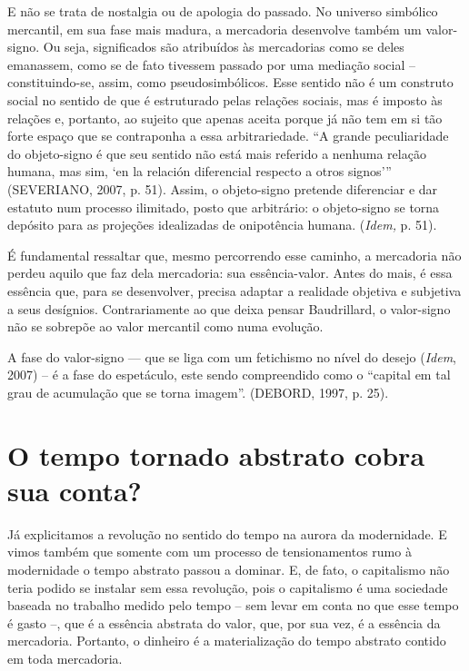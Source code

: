 E não se trata de nostalgia ou de apologia do passado. No universo
simbólico mercantil, em sua fase mais madura, a mercadoria desenvolve
também um valor-signo. Ou seja, significados são atribuídos às
mercadorias como se deles emanassem, como se de fato tivessem passado
por uma mediação social -- constituindo-se, assim, como
pseudosimbólicos. Esse sentido não é um construto social no sentido de
que é estruturado pelas relações sociais, mas é imposto às relações e,
portanto, ao sujeito que apenas aceita porque já não tem em si tão forte
espaço que se contraponha a essa arbitrariedade. ``A grande
peculiaridade do objeto-signo é que seu sentido não está mais referido a
nenhuma relação humana, mas sim, `en la relación diferencial respecto a
otros signos''' (SEVERIANO, 2007, p. 51). Assim, o objeto-signo pretende
diferenciar e dar estatuto num processo ilimitado, posto que arbitrário:
o objeto-signo se torna depósito para as projeções idealizadas de
onipotência humana. (\emph{Idem,} p. 51).

É fundamental ressaltar que, mesmo percorrendo esse caminho, a
mercadoria não perdeu aquilo que faz dela mercadoria: sua
essência-valor. Antes do mais, é essa essência que, para se desenvolver,
precisa adaptar a realidade objetiva e subjetiva a seus desígnios.
Contrariamente ao que deixa pensar Baudrillard, o valor-signo não se
sobrepõe ao valor mercantil como numa evolução.

A fase do valor-signo --- que se liga com um fetichismo no nível do
desejo (\emph{Idem}, 2007) -- é a fase do espetáculo, este sendo
compreendido como o ``capital em tal grau de acumulação que se torna
imagem''. (DEBORD, 1997, p. 25).

\section{O tempo tornado abstrato cobra sua conta?}

Já explicitamos a revolução no sentido do tempo na aurora da
modernidade. E vimos também que somente com um processo de
tensionamentos rumo à modernidade o tempo abstrato passou a dominar. E,
de fato, o capitalismo não teria podido se instalar sem essa revolução,
pois o capitalismo é uma sociedade baseada no trabalho medido pelo tempo
-- sem levar em conta no que esse tempo é gasto --, que é a essência
abstrata do valor, que, por sua vez, é a essência da mercadoria.
Portanto, o dinheiro é a materialização do tempo abstrato contido em
toda mercadoria.

